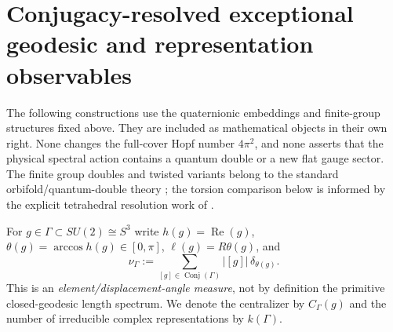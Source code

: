 \documentclass[11pt]{article}
\begin{document}
\section{Conjugacy-resolved exceptional geodesic and representation observables}
\label{p1b:sec:v14-conjugacy-double-gauge}
The following constructions use the quaternionic embeddings and finite-group
structures fixed above.  They are included as mathematical objects in their
own right.  None changes the full-cover Hopf number $4\pi^2$, and none asserts
that the physical spectral action contains a quantum double or a new flat gauge
sector.  The finite group doubles and twisted variants belong to the standard
orbifold/quantum-double theory \cite{Kirillov2002Modular,DijkgraafPasquierRoche1991};
the torsion comparison below is informed by the explicit tetrahedral resolution
work of \cite{ChiriviSpreafico2018}.

\begin{definition}
\label{p1b:def:v14-class-geodesic}
For $g\in\Gamma\subset SU(2)\cong S^3$ write
$h(g)=\operatorname{Re}(g)$, $\theta(g)=\arccos h(g)\in[0,\pi]$,
$\ell(g)=R\theta(g)$, and
\[
 \nu_\Gamma:=\sum_{[g]\in\operatorname{Conj}(\Gamma)}
                  |[g]|\,\delta_{\theta(g)}.
\]
This is an \emph{element/displacement-angle measure}, not by definition the
primitive closed-geodesic length spectrum.  We denote the centralizer by
$C_\Gamma(g)$ and the number of irreducible complex representations by $k(\Gamma)$.
\end{definition}
\end{document}
